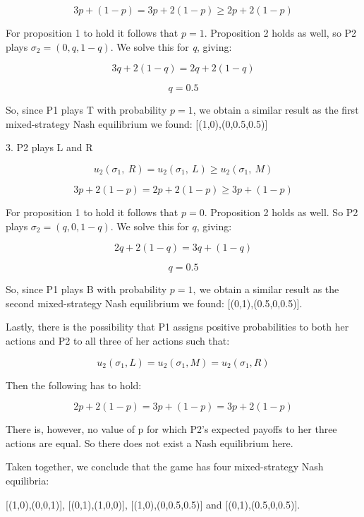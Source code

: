 \documentclass[a4paper]{article}
\begin{document}
\[3p + \left( 1 - p \right) = 3p + 2\left( 1 - p \right) \geq 2p + 2\left( 1 - p \right)\]

For proposition 1 to hold it follows that \(p = 1\). Proposition 2 holds
as well, so P2 plays \(\sigma_{2} = (0,q,1 - q)\). We solve this for
\emph{q}, giving:

\[3q + 2\left( 1 - q \right) = 2q + 2\left( 1 - q \right)\]

\[q = 0.5\]

So, since P1 plays T with probability \(p = 1\), we obtain a similar
result as the first mixed-strategy Nash equilibrium we found:
{[}(1,0),(0,0.5,0.5){]}

3. P2 plays L and R

\[u_{2}\left( \sigma_{1},\ R \right) = u_{2}\left( \sigma_{1},\ L \right) \geq u_{2}(\sigma_{1},\ M)\]

\[3p + 2\left( 1 - p \right) = 2p + 2\left( 1 - p \right) \geq 3p + (1 - p)\]

For proposition 1 to hold it follows that \(p = 0\). Proposition 2 holds
as well. So P2 plays \(\sigma_{2} = (q,0,1 - q)\). We solve this for $q$,
giving:

\[2q + 2\left( 1 - q \right) = 3q + \left( 1 - q \right)\]

\[q = 0.5\]

So, since P1 plays B with probability \(p = 1,\ \)we obtain a similar
result as the second mixed-strategy Nash equilibrium we found:
{[}(0,1),(0.5,0,0.5){]}.

Lastly, there is the possibility that P1 assigns positive probabilities
to both her actions and P2 to all three of her actions such that:

\[u_{2}\left( \sigma_{1},L \right) = u_{2}\left( \sigma_{1},M \right) = u_{2}(\sigma_{1},R)\]

Then the following has to hold:

\[2p + 2\left( 1 - p \right) = 3p + \left( 1 - p \right) = 3p + 2(1 - p)\]

There is, however, no value of \(\text{p\ }\)for which P2's expected
payoffs to her three actions are equal. So there does not exist a Nash
equilibrium here.

Taken together, we conclude that the game has four mixed-strategy Nash
equilibria:

{[}(1,0),(0,0,1){]}, {[}(0,1),(1,0,0){]}, {[}(1,0),(0,0.5,0.5){]} and
{[}(0,1),(0.5,0,0.5){]}.
\end{document}
